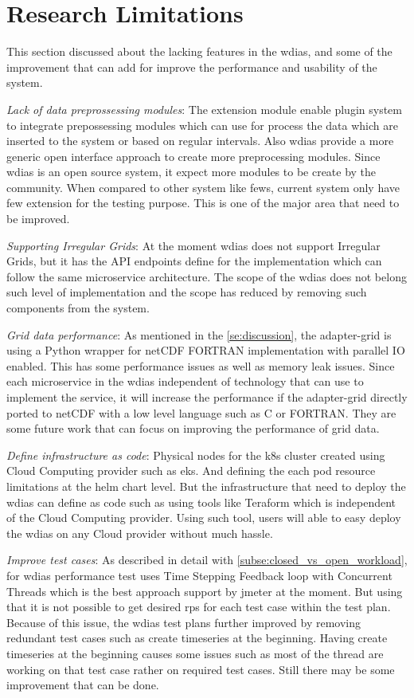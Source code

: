 \section{Research Limitations}
This section discussed about the lacking features in the \acrshort{wdias}, and some of the improvement that can add for improve the performance and usability of the system.

\emph{Lack of data preprossessing modules}:
The extension module enable plugin system to integrate prepossessing modules which can use for process the data which are inserted to the system or based on regular intervals. Also \acrshort{wdias} provide a more generic open interface approach to create more preprocessing modules. Since \acrshort{wdias} is an open source system, it expect more modules to be create by the community. When compared to other system like \acrshort{fews}, current system only have few extension for the testing purpose. This is one of the major area that need to be improved.

\emph{Supporting Irregular Grids}:
At the moment \acrshort{wdias} does not support Irregular Grids, but it has the API endpoints define for the implementation which can follow the same microservice architecture. The scope of the \acrshort{wdias} does not belong such level of implementation and the scope has reduced by removing such components from the system.

\emph{Grid data performance}:
As mentioned in the \ref{se:discussion}, the adapter-grid is using a Python wrapper for netCDF FORTRAN implementation with parallel IO enabled. This has some performance issues as well as memory leak issues. Since each microservice in the \acrshort{wdias} independent of technology that can use to implement the service, it will increase the performance if the adapter-grid directly ported to netCDF with a low level language such as C or FORTRAN. They are some future work that can focus on improving the performance of grid data.

\emph{Define infrastructure as code}:
Physical nodes for the \acrshort{k8s} cluster created using Cloud Computing provider such as \acrshort{eks}. And defining the each pod resource limitations at the helm chart level. But the infrastructure that need to deploy the \acrshort{wdias} can define as code such as using tools like Teraform which is independent of the Cloud Computing provider. Using such tool, users will able to easy deploy the \acrshort{wdias} on any Cloud provider without much hassle.

\emph{Improve test cases}:
As described in detail with \ref{subse:closed_vs_open_workload}, for \acrshort{wdias} performance test uses Time Stepping Feedback loop with Concurrent Threads which is the best approach support by \acrshort{jmeter} at the moment. But using that it is not possible to get desired \acrshort{rps} for each test case within the test plan.
Because of this issue, the \acrshort{wdias} test plans further improved by removing redundant test cases such as create timeseries at the beginning. Having create timeseries at the beginning causes some issues such as most of the thread are working on that test case rather on required test cases. Still there may be some improvement that can be done. 

